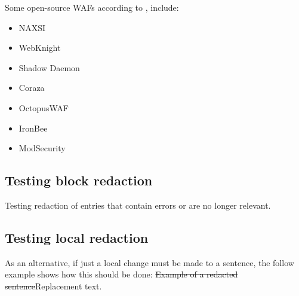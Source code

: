Some open-source WAFs according to \cite{OSWAFS}, include:
\begin{itemize}
    \item NAXSI
    \item WebKnight
    \item Shadow Daemon
    \item Coraza
    \item OctopusWAF
    \item IronBee
    \item ModSecurity
\end{itemize}

\pendsign

\begin{mdframed}[style=redact,
    frametitle={\textcolor{white}{Redacted,
        see page~\pageref{sec:20240401} for correct version.}}]

\subsection{Testing block redaction}

Testing redaction of entries that contain errors or are no longer relevant.

\end{mdframed}

\subsection{Testing local redaction}

As an alternative, if just a local change must be made to a sentence, the
follow example shows how this should be done: \st{Example of a redacted
sentence}\textcolor{ScarletRed}{Replacement text}.

\pendsign
